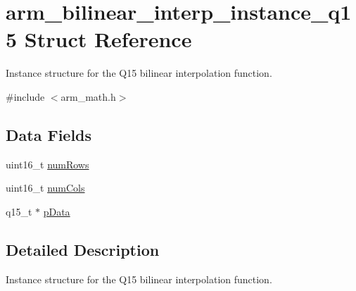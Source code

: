 \hypertarget{structarm__bilinear__interp__instance__q15}{\section{arm\-\_\-bilinear\-\_\-interp\-\_\-instance\-\_\-q15 Struct Reference}
\label{structarm__bilinear__interp__instance__q15}
}


Instance structure for the Q15 bilinear interpolation function.  




{\ttfamily \#include $<$arm\-\_\-math.\-h$>$}

\subsection*{Data Fields}
\begin{DoxyCompactItemize}
\item 
uint16\-\_\-t \hyperlink{structarm__bilinear__interp__instance__q15_a1bcf80ccdc2acc29198f1592ae300390}{num\-Rows}
\item 
uint16\-\_\-t \hyperlink{structarm__bilinear__interp__instance__q15_a4bb5ec0d13eb4c9cf887aa8366a44117}{num\-Cols}
\item 
q15\-\_\-t $\ast$ \hyperlink{structarm__bilinear__interp__instance__q15_a817ede38365e63e561a12069c6c5c087}{p\-Data}
\end{DoxyCompactItemize}


\subsection{Detailed Description}
Instance structure for the Q15 bilinear interpolation function. 

